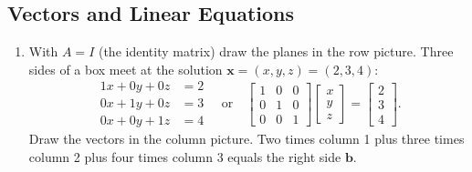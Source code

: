 \documentclass[14pt, a4paper]{article}
\begin{document}
\subsection{Vectors and Linear Equations}
\begin{enumerate}
    \item With $A = I$ (the identity matrix) draw the planes in the row picture. Three sides of a box meet at the solution $\boldsymbol{x} = (x, y, z) = (2, 3, 4)$:
          \[
              \begin{aligned}
                  1x + 0y + 0z & = 2 \\
                  0x + 1y + 0z & = 3 \\
                  0x + 0y + 1z & = 4
              \end{aligned}
              \quad \text{or} \quad
              \begin{bmatrix}
                  1 & 0 & 0 \\
                  0 & 1 & 0 \\
                  0 & 0 & 1
              \end{bmatrix}
              \begin{bmatrix} x \\ y \\ z \end{bmatrix}
              =
              \begin{bmatrix} 2 \\ 3 \\ 4 \end{bmatrix}.
          \]
          Draw the vectors in the column picture. Two times column 1 plus three times column 2 plus four times column 3 equals the right side $\boldsymbol{b}$.


\end{enumerate}
\end{document}

